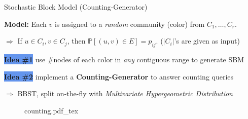 \vspace{-0.3em}
\begin{block}{Stochastic Block Model (Counting-Generator)} %

\textbf{Model:} Each $v$ is assigned to a \emph{random} community (color) from $C_1, \ldots, C_r$.

\quad$\Rightarrow$ If $u\in C_i, v\in C_j$, then $\mathbb {P}[{(u, v)\in E}] = p_{ij}$.
($|C_i|$'s are given as input)

\vspace{15pt}

\colorbox{CornflowerBlue}{\textbf{Idea \#1}} use \#nodes of each color in \emph{any} contiguous range to generate SBM

\vspace{-0.5in}
\begin{figure}[h]
    \centering
\end{figure}

\colorbox{CornflowerBlue}{\textbf{Idea \#2}} implement a \textbf{Counting-Generator} to answer counting queries

\quad$\Rightarrow$ BBST, split on-the-fly with \emph{Multivariate Hypergeometric Distribution}



\iffalse{

\begin{itemize}
\item [] \textbf{Given sizes of each comunity $C_i$ and a range of length $\ell$}
    \item Count number of occurrences of each community in any contiguous range%
    \item Sample from \emph{Multivariate Hypergeometric Distribution}%
\[
\Pr[\mathbf{S}^\mathbf{C}_\ell = \langle s_1, \ldots, s_r \rangle]
= \frac{\binom{C_1}{s_1}\cdot\binom{C_2}{s_2}\cdots\binom{C_r}{s_r}}{\binom{B}{\ell}}
\hspace{2ex}\textrm{ where } \scriptstyle{
    \ell = \mathlarger{\sum}\limits^{r}_{i=1} s_i \textrm{ and } B = \mathlarger{\sum}\limits^{r}_{i=1} C_i
}
\]
\end{itemize}

\fi


\vspace{0.5em}
\begin{figure}[h!]\centering
    \def\svgwidth{0.93\columnwidth}
    {counting.pdf_tex}
\end{figure}


\end{block}
